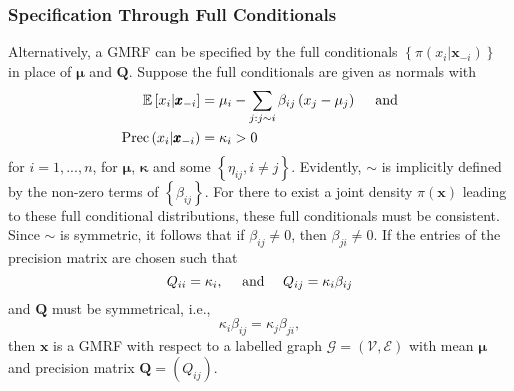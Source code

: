 \documentclass[12pt]{book}
\begin{document}
\subsubsection{Specification Through Full Conditionals}
Alternatively, a GMRF can be specified by the full conditionals $\left\lbrace\pi\left(x_i|\pmb{x}_{-i}\right)\right\rbrace$ in place of $\pmb{\mu}$ and $\pmb{Q}$. Suppose the full conditionals are given as normals with
\begin{align}
    \mathbb{E}\left[x_i|\pmb{x}_{-i}\right] &= \mu_i-\sum_{j:j\sim i}\beta_{ij}\left(x_j-\mu_j\right)\hspace{10pt}\hbox{ and}\\
    \hbox{Prec}\left(x_i|\pmb{x}_{-i}\right) &= \kappa_i>0
\end{align}
for $i=1,...,n$, for $\pmb{\mu}$, $\pmb{\kappa}$ and some $\left\lbrace\eta_{ij},i\neq j\right\rbrace$. Evidently, $\sim$ is implicitly defined by the non-zero terms of $\left\lbrace\beta_{ij}\right\rbrace$. For there to exist a joint density $\pi\left(\pmb{x}\right)$ leading to these full conditional distributions, these full conditionals must be consistent. Since $\sim$ is symmetric, it follows that if $\beta_{ij}\neq 0$, then $\beta_{ji}\neq0$. If the entries of the precision matrix are chosen such that
\begin{equation*}
    Q_{ii}=\kappa_i, \hspace{10pt}\hbox{ and }\hspace{10pt} Q_{ij}=\kappa_i\beta_{ij}
\end{equation*}
and $\pmb{Q}$ must be symmetrical, i.e.,
\begin{equation*}
    \kappa_i\beta_{ij}=\kappa_j\beta_{ji},
\end{equation*}
then $\pmb{x}$ is a GMRF with respect to a labelled graph $\mathcal{G}=\left(\mathcal{V}, \mathcal{E}\right)$ with mean $\pmb{\mu}$ and precision matrix $\pmb{Q}=\left(Q_{ij}\right)$.
\end{document}
